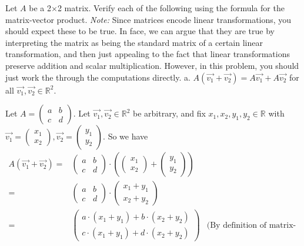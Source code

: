 \documentclass[12pt]{article}
\newenvironment{problem}[2][Problem]
{
	\begin{trivlist} 
		\item[\hskip \labelsep {\bfseries #1 #2:}]
	}
{
	\end{trivlist}
	}
\newenvironment{solution}[1][Solution]
{
	\begin{trivlist} 
		\item[\hskip \labelsep {\itshape #1:}]
	}
	{
	\end{trivlist}
}
\begin{document}
\newpage
\begin{problem}{5}
Let $A$ be a 2$\times$2 matrix. Verify each of the following using the formula for the matrix-vector product.
\noindent
\newline
{\it Note:} Since matrices encode linear transformations, you should expect these to be true. In face, we can argue that they are true by interpreting the matrix as being the standard matrix of a certain linear transformation, and then just appealing to the fact that linear transformations preserve addition and scalar multiplication. However, in this problem, you should just work the through the computations directly. 
\noindent
\newline
\newline
a. $A(\vec{v_{1}}+\vec{v_{2}})=A\vec{v_{1}}+A\vec{v_{2}}$ for all $\vec{v_{1}},\vec{v_{2}} \in \mathbb{R}^2$.
\begin{solution}
Let $A=\begin{pmatrix} a&b\\c&d\end{pmatrix}$. Let $\vec{v_{1}},\vec{v_{2}} \in \mathbb{R}^2$ be arbitrary, and fix $x_{1},x_{2},y_{1},y_{2} \in \mathbb{R}$ with $\vec{v_{1}}=\begin{pmatrix}x_{1}\\x_{2}\end{pmatrix},\vec{v_{2}}=\begin{pmatrix}y_{1}\\y_{2}\end{pmatrix}$.
So we have
\begin{align*}
A(\vec{v_{1}}+\vec{v_{2}}) =& \begin{pmatrix} a&b\\c&d\end{pmatrix} \cdot \left(\begin{pmatrix}x_{1}\\x_{2}\end{pmatrix}+\begin{pmatrix}y_{1}\\y_{2}\end{pmatrix}\right) &\\
=&\begin{pmatrix} a&b\\c&d\end{pmatrix} \cdot \begin{pmatrix}x_{1}+y_{1}\\x_{2}+y_{2}\end{pmatrix} &\\
=&\begin{pmatrix} a\cdot (x_{1}+y_{1})+ b\cdot (x_{2}+y_{2})\\c\cdot (x_{1}+y_{1}) +d\cdot (x_{2}+y_{2})\end{pmatrix} &\text{(By definition of matrix-vector product)} \\

\end{align*}
\end{solution}
\end{problem}
\end{document}
